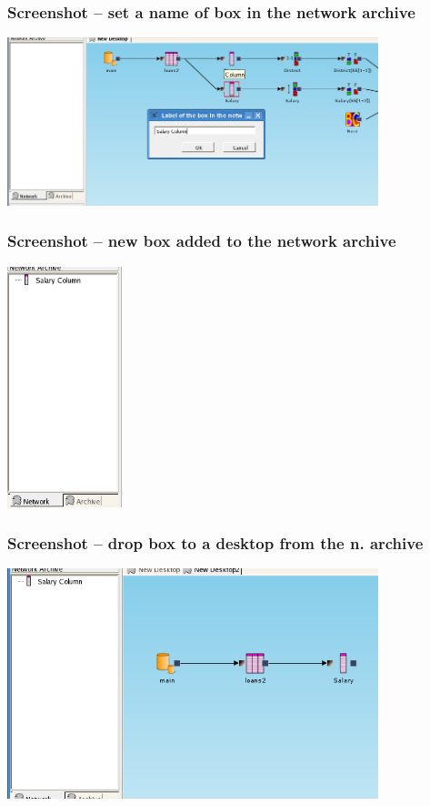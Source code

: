 \documentclass{beamer}
\begin{document}
\begin{frame}
	\frametitle{Screenshot -- set a name of box in the network archive}
	\includegraphics[width=10.8cm]{set_name_of_box_in_network_archive}
\end{frame}

\begin{frame}
	\frametitle{Screenshot -- new box added to the network archive}
	\includegraphics[height=7cm]{network_archive_box_added}
\end{frame}

\begin{frame}
	\frametitle{Screenshot -- drop box to a desktop from the n. archive}
	\includegraphics[width=10.8cm]{network_archive_drop_to_desktop}
\end{frame}
\end{document}
